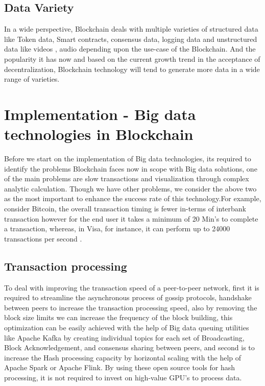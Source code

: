 \documentclass[sigconf]{acmart}
\begin{document}
\subsection{Data Variety}
In a wide perspective, Blockchain deals with multiple varieties of structured data like Token data, Smart contracts, consensus data, logging data and unstructured data like videos \cite{livepeer-BC-stream}, audio depending upon the use-case of the Blockchain. And the popularity it has now and based on the current growth trend in the acceptance of decentralization, Blockchain technology will tend to generate more data in a wide range of varieties.

\section{Implementation - Big data technologies in Blockchain}
Before we start on the implementation of Big data technologies, its required to identify the problems Blockchain faces now in scope with Big data solutions, one of the main problems are slow transactions and visualization through complex analytic calculation. Though we have other problems, we consider the above two as the most important to enhance the success rate of this technology.For example, consider Bitcoin, the overall transaction timing is fewer in-terms of interbank transaction however for the end user it takes a minimum of 20 Min's to complete a transaction, whereas, in Visa, for instance, it can perform up to 24000 transactions per second \cite{Visa}.


\subsection{Transaction processing}
To deal with improving the transaction speed of a peer-to-peer network, first it is required to streamline the asynchronous process of gossip protocols, handshake between peers to increase the transaction processing speed, also by removing the block size limits\cite{Optimize-bitcoin} we can increase the frequency of the block building, this optimization can be easily achieved with the help of Big data queuing utilities like Apache Kafka by creating individual topics for each set of Broadcasting, Block Acknowledgement, and consensus sharing between peers,   and second is to increase the Hash processing capacity by horizontal scaling with the help of Apache Spark or Apache Flink. By using these open source tools for hash processing, it is not required to invest on high-value GPU's to process data.
\end{document}
